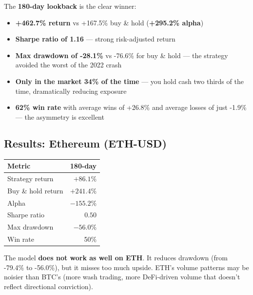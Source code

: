 \documentclass[11pt,a4paper]{article}
\begin{document}
\vspace{1em}

The \textbf{180-day lookback} is the clear winner:

\begin{itemize}[leftmargin=2em]
    \item \textbf{+462.7\% return} vs +167.5\% buy \& hold
          (\textbf{+295.2\% alpha})
    \item \textbf{Sharpe ratio of 1.16} --- strong risk-adjusted return
    \item \textbf{Max drawdown of -28.1\%} vs -76.6\% for buy \& hold
          --- the strategy avoided the worst of the 2022 crash
    \item \textbf{Only in the market 34\% of the time} --- you hold
          cash two thirds of the time, dramatically reducing exposure
    \item \textbf{62\% win rate} with average wins of +26.8\% and
          average losses of just -1.9\% --- the asymmetry is excellent
\end{itemize}

\subsection{Results: Ethereum (ETH-USD)}

\vspace{0.5em}
\begin{tabular}{@{}lr@{}}
    \toprule
    \textbf{Metric} & \textbf{180-day} \\
    \midrule
    Strategy return    & $+86.1\%$  \\
    Buy \& hold return & $+241.4\%$ \\
    Alpha              & $-155.2\%$ \\
    Sharpe ratio       & $0.50$     \\
    Max drawdown       & $-56.0\%$  \\
    Win rate           & 50\%       \\
    \bottomrule
\end{tabular}

\vspace{0.5em}
The model \textbf{does not work as well on ETH}. It reduces drawdown
(from -79.4\% to -56.0\%), but it misses too much upside.
ETH's volume patterns may be noisier than BTC's (more wash trading,
more DeFi-driven volume that doesn't reflect directional conviction).

\end{document}
